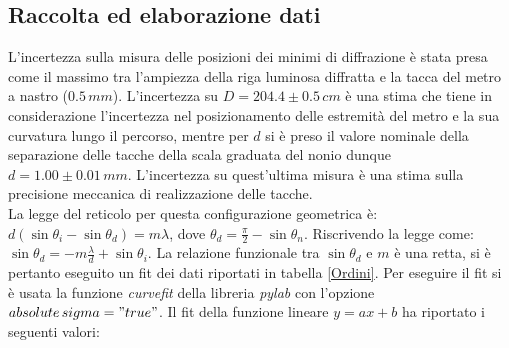 \documentclass[10pt,a4paper]{article}
\begin{document}

\subsection{Raccolta ed elaborazione dati}

L'incertezza sulla misura delle posizioni dei minimi di diffrazione è stata presa come il massimo tra l'ampiezza della riga luminosa diffratta e la tacca del metro a nastro ($0.5 \,mm$). L'incertezza su $D = 204.4 \pm 0.5 \, cm$ è una stima che tiene in considerazione l'incertezza nel posizionamento delle estremità del metro e la sua curvatura lungo il percorso, mentre per $d$ si è preso il valore nominale della separazione delle tacche della scala graduata del nonio dunque $d = 1.00 \pm 0.01 \, mm$. L'incertezza su quest'ultima misura è una stima sulla precisione meccanica di realizzazione delle tacche.\\
La legge del reticolo per questa configurazione geometrica è: $d(\sin  \theta_i - \sin \theta_d)  = m \lambda $, dove $\theta_d = \frac{\pi}{2} - \sin \theta_n $. Riscrivendo la legge come: $\sin \theta_d = -m \frac{\lambda}{d} + \sin \theta_i$. La relazione funzionale tra $\sin  \theta_d$ e $m$ è una retta, si è pertanto eseguito un fit dei dati riportati in tabella \ref{Ordini}. Per eseguire il fit si è usata la funzione \emph{curvefit} della libreria \emph{pylab} con l'opzione \emph{$absolute\,sigma = "true"$}. Il fit della funzione lineare $y = ax+b$ ha riportato i seguenti valori: \\
\end{document}
